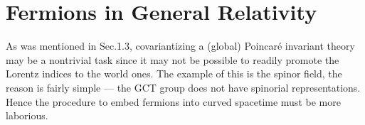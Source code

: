 \documentclass[12pt]{article}
\begin{document}
\section{Fermions in General Relativity}

As was mentioned in Sec.1.3, covariantizing a (global) Poincar\'e invariant theory may be a nontrivial task since it
may not be possible to readily promote the Lorentz indices to the world ones. The example of this is the spinor field, the reason is fairly simple --- the GCT group does not have spinorial representations. Hence the procedure to embed fermions into curved spacetime must be more laborious.

\end{document}
